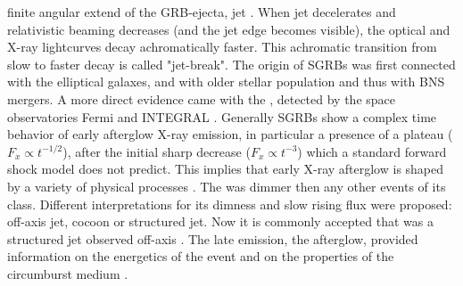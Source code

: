 finite angular extend of the \ac{GRB}-ejecta, jet \citep[\eg][]{Rhoads:1999wm,Sari:1999mr}. 
When jet decelerates and relativistic beaming decreases (and the jet edge becomes visible), 
the optical and X-ray lightcurves decay achromatically faster. This achromatic transition 
from slow to faster decay is called "jet-break".
%
%
The origin of \acp{SGRB} was first connected with the elliptical galaxes, and with 
older stellar population 
\citep[\eg][]{Gehrels:2005qk,Fox:2005kv,Barthelmy:2005bx,Berger:2005dr,Panaitescu:2005er,Bloom:2005qx,Guetta:2005bb,Nakar:2007yr} 
and thus with \ac{BNS} mergers. A more direct evidence came with the \GRB{}
\citep{Savchenko:2017ffs,Alexander:2017aly,Troja:2017nqp,Monitor:2017mdv,Nynka:2018vup,Hajela:2019mjy}, 
detected by the space observatories Fermi \citep{TheFermi-LAT:2015kwa} and INTEGRAL \citep{Winkler:2011}.
%
Generally \acp{SGRB} show a complex time behavior of early afterglow X-ray emission, 
in particular a presence of a plateau ($F_{x}\propto t^{-1/2}$), after the initial sharp 
decrease ($F_{x}\propto t^{-3}$) which a standard forward shock model does not predict. 
This implies that early X-ray afterglow is shaped by a variety of physical processes 
\citep{Zhang:2005fa}.
%
The \GRB{} was dimmer then any other events of its class. 
Different interpretations for its dimness and slow rising flux were proposed: off-axis jet, 
cocoon or structured jet. Now it is commonly accepted that \GRB{} was a structured jet 
observed off-axis 
\citep[\eg][]{Fong:2017ekk,Troja:2017nqp,Margutti:2018xqd,Lamb:2017ych,Lamb:2018ohw,Ryan:2019fhz,Alexander:2018dcl,Mooley:2018dlz,Ghirlanda:2018uyx}.
The \GRB{} late emission, the afterglow, provided information on 
the energetics of the event and on the properties of the circumburst medium 
\citep[\eg][]{Hajela:2019mjy}. 

